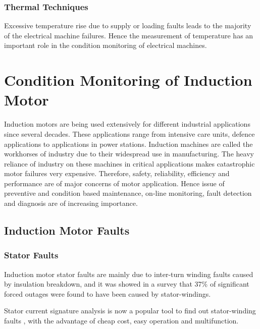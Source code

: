 \documentclass[a4paper,11pt]{article}
\begin{document}
\subsubsection{Thermal Techniques}
Excessive temperature rise due to supply or loading faults leads to the majority of the electrical machine failures. Hence the measurement of temperature has an important role in the condition monitoring of electrical machines. \cite{rps6}

\section{Condition Monitoring of Induction Motor}
Induction motors are being used extensively for different industrial applications since several decades. These applications range from intensive care units, defence applications to applications in power stations. Induction machines are called the workhorses of industry due to their widespread use in manufacturing. The heavy reliance of industry on these machines in critical applications makes catastrophic motor failures very expensive. Therefore, safety, reliability,  efficiency and performance are of major concerns of motor application. Hence issue of preventive and condition based maintenance, on-line monitoring, fault detection and diagnosis are of increasing importance.

\subsection{Induction Motor Faults}
\subsubsection*{Stator Faults}
Induction motor stator faults are mainly due to inter-turn winding faults caused by insulation breakdown, and it was showed in a survey that 37\% of significant forced outages were found to have been caused by stator-windings. \cite{40}

Stator current signature analysis is now a popular tool to find out stator-winding faults \cite{53},\cite{55} with the advantage of cheap cost, easy operation and multifunction. 
\end{document}
